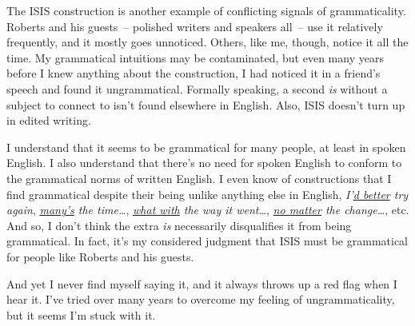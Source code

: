 \bigskip

The ISIS construction is another example of conflicting signals of grammaticality. Roberts and his guests~-- polished writers and speakers all~-- use it relatively frequently, and it mostly goes unnoticed. Others, like me, though, notice it all the time. My grammatical intuitions may be contaminated, but even many years before I knew anything about the construction, I had noticed it in a friend's speech and found it ungrammatical. Formally speaking, a second \textit{is} without a subject to connect to isn't found elsewhere in English. Also, ISIS doesn't turn up in edited writing.

I understand that it seems to be grammatical for many people, at least in spoken English. I also understand that there's no need for spoken English to conform to the grammatical norms of written English. I even know of constructions that I find grammatical despite their being unlike anything else in English, \textit{I'\uline{d better} try again}, \textit{\uline{many's} the time\dots}, \textit{\uline{what with} the way it went\dots}, \textit{\uline{no matter} the change\dots}, etc. And so, I don't think the extra \textit{is} necessarily disqualifies it from being grammatical. In fact, it's my considered judgment that ISIS must be grammatical for people like Roberts and his guests.

And yet I never find myself saying it, and it always throws up a red flag when I hear it. I've tried over many years to overcome my feeling of ungrammaticality, but it seems I'm stuck with it.





